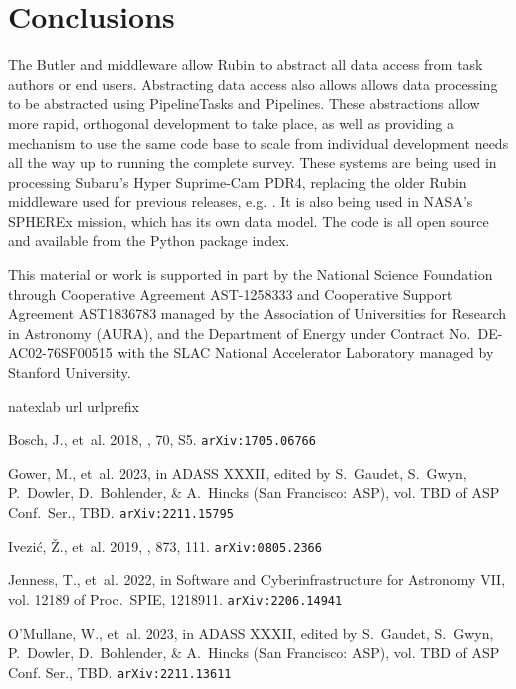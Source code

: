 \documentclass[11pt,twoside]{article}
\begin{document}
\section{Conclusions}
The Butler and middleware allow Rubin to abstract all data access from task authors or end users. Abstracting data access also allows allows data processing to be abstracted using PipelineTasks and Pipelines. These abstractions allow more rapid, orthogonal development to take place, as well as providing a mechanism to use the same code base to scale from individual development needs all the way up to running the complete survey. These systems are being used in processing Subaru's Hyper Suprime-Cam PDR4, replacing the older Rubin middleware used for previous releases, e.g. \citet{2018PASJ...70S...5B}. It is also being used in NASA's SPHEREx mission, which has its own data model. The code is all open source and available from the Python package index.

\acknowledgments This material or work is supported in part by the National Science Foundation through Cooperative Agreement AST-1258333 and Cooperative Support Agreement AST1836783 managed by the Association of Universities for Research in Astronomy (AURA), and the Department of Energy under Contract No.\ DE-AC02-76SF00515 with the SLAC National Accelerator Laboratory managed by Stanford University.

\begin{thebibliography}{}
    \expandafter\ifx\csname natexlab\endcsname\relax\def\natexlab#1{#1}\fi
    \expandafter\ifx\csname url\endcsname\relax
      \def\url#1{\texttt{#1}}\fi
    \expandafter\ifx\csname urlprefix\endcsname\relax\def\urlprefix{URL }\fi
    \providecommand{\eprint}[2][]{\url{#2}}

    {Bosch}, J., et~al. 2018, \pasj, 70, S5. \eprint{arXiv:1705.06766}

    Gower, M., et~al. 2023, in ADASS XXXII, edited by S.~{Gaudet}, S.~{Gwyn},
      P.~{Dowler}, D.~{Bohlender}, \& A.~{Hincks} (San Francisco: ASP), vol. TBD of
      ASP Conf.\ Ser., TBD. \eprint{arXiv:2211.15795}

    {Ivezi{\'c}}, {\v Z}., et~al. 2019, \apj, 873, 111. \eprint{arXiv:0805.2366}

    {Jenness}, T., et~al. 2022, in Software and Cyberinfrastructure for Astronomy
      VII, vol. 12189 of Proc.\ SPIE, 1218911. \eprint{arXiv:2206.14941}

    O'Mullane, W., et~al. 2023, in ADASS XXXII, edited by S.~{Gaudet}, S.~{Gwyn},
      P.~{Dowler}, D.~{Bohlender}, \& A.~{Hincks} (San Francisco: ASP), vol. TBD of
      ASP Conf. Ser., TBD. \eprint{arXiv:2211.13611}

    \end{thebibliography}
\end{document}
